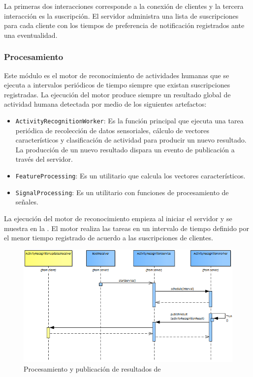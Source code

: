 La primeras dos interacciones corresponde a la conexión de clientes
y la tercera interacción es la suscripción. El servidor administra
una lista de suscripciones para cada cliente con los tiempos de preferencia
de notificación registrados ante una eventualidad. 

\subsubsection{Procesamiento}

Este módulo es el motor de reconocimiento de actividades humanas que
se ejecuta a intervalos periódicos de tiempo siempre que existan suscripciones
registradas. La ejecución del motor produce siempre un resultado global
de actividad humana detectada por medio de los siguientes artefactos: 
\begin{itemize}
\item \texttt{\small{}ActivityRecognitionWorker}: Es la función principal
que ejecuta una tarea periódica de recolección de datos sensoriales,
cálculo de vectores característicos y clasificación de actividad para
producir un nuevo resultado. La producción de un nuevo resultado dispara
un evento de publicación a través del servidor.
\item \texttt{\small{}FeatureProcessing}: Es un utilitario que calcula los
vectores característicos.
\item \texttt{\small{}SignalProcessing}: Es un utilitario con funciones
de procesamiento de señales. 
\end{itemize}
La ejecución del motor de reconocimiento empieza al iniciar el servidor
y se muestra en la . El motor realiza
las tareas en un intervalo de tiempo definido por el menor tiempo
registrado de acuerdo a las suscripciones de clientes.

\begin{figure}[H]
\begin{centering}
\includegraphics[width=1\columnwidth]{capitulo-5/graphics/service_worker}
\par\end{centering}
\caption[Procesamiento y publicación de resultados de HARDroid]{\label{fig5:service-worker}Procesamiento y publicación de resultados
de }
\end{figure}

